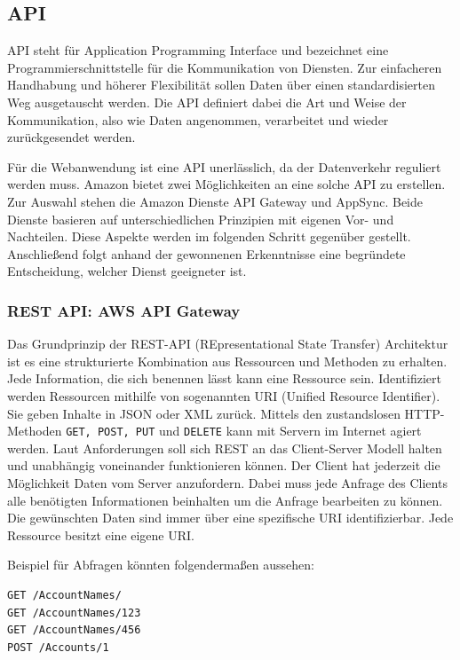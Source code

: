 

\subsection{API}
API steht für Application Programming Interface und bezeichnet eine Programmierschnittstelle für die Kommunikation von Diensten.
Zur einfacheren Handhabung und höherer Flexibilität sollen Daten über einen standardisierten Weg ausgetauscht werden. Die API definiert
dabei die Art und Weise der Kommunikation, also wie Daten angenommen, verarbeitet und wieder zurückgesendet werden.

Für die Webanwendung ist eine API unerlässlich, da der Datenverkehr reguliert werden muss.
Amazon bietet zwei Möglichkeiten an eine solche API zu erstellen.
Zur Auswahl stehen die Amazon Dienste API Gateway und AppSync.
Beide Dienste basieren auf unterschiedlichen Prinzipien mit eigenen Vor- und Nachteilen.
Diese Aspekte werden im folgenden Schritt gegenüber gestellt.
Anschließend folgt anhand der gewonnenen Erkenntnisse eine begründete Entscheidung, welcher Dienst geeigneter ist.

\clearpage
\subsubsection{REST API: AWS API Gateway}
Das Grundprinzip der REST-API (REpresentational State Transfer) Architektur ist es eine strukturierte Kombination aus Ressourcen und Methoden zu erhalten.
Jede Information, die sich benennen lässt kann eine Ressource sein.
Identifiziert werden Ressourcen mithilfe von sogenannten URI (Unified Resource Identifier).
Sie geben Inhalte in JSON oder XML zurück.
Mittels den zustandslosen HTTP-Methoden \verb+GET, POST, PUT+ und \verb+DELETE+ kann mit Servern im Internet agiert werden.
Laut Anforderungen soll sich REST an das Client-Server Modell halten und unabhängig voneinander funktionieren können.
Der Client hat jederzeit die Möglichkeit Daten vom Server anzufordern.
Dabei muss jede Anfrage des Clients alle benötigten Informationen beinhalten um die Anfrage bearbeiten zu können.
Die gewünschten Daten sind immer über eine spezifische URI identifizierbar.
Jede Ressource besitzt eine eigene URI.\cite{REST}

Beispiel für Abfragen könnten folgendermaßen aussehen:

\begin{lstlisting}[basicstyle=\ttfamily, breaklines=true , frame = single, backgroundcolor=\color{flashwhite} ]
GET /AccountNames/
GET /AccountNames/123
GET /AccountNames/456
POST /Accounts/1
\end{lstlisting}

